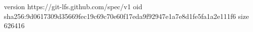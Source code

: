 version https://git-lfs.github.com/spec/v1
oid sha256:9d0617309d35669fec19c69c70e60f17eda9f92947e1a7e8d1fe5fa1a2e111f6
size 626416

